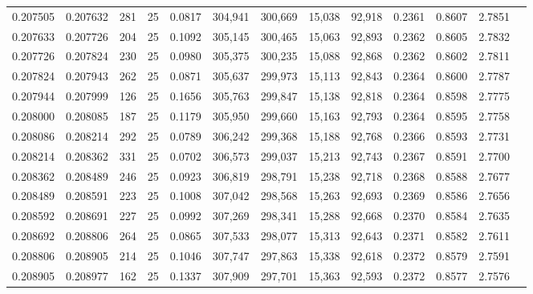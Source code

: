 \begin{tabular}{rrrrrrrrrrrrr}
0.207505 & 0.207632 &   281 &  25 &                                     0.0817 & 304,941 & 300,669 &  15,038 &  92,918 & 0.2361 & 0.8607 & 2.7851 \\
0.207633 & 0.207726 &   204 &  25 &                                     0.1092 & 305,145 & 300,465 &  15,063 &  92,893 & 0.2362 & 0.8605 & 2.7832 \\
0.207726 & 0.207824 &   230 &  25 &                                     0.0980 & 305,375 & 300,235 &  15,088 &  92,868 & 0.2362 & 0.8602 & 2.7811 \\
0.207824 & 0.207943 &   262 &  25 &                                     0.0871 & 305,637 & 299,973 &  15,113 &  92,843 & 0.2364 & 0.8600 & 2.7787 \\
0.207944 & 0.207999 &   126 &  25 &                                     0.1656 & 305,763 & 299,847 &  15,138 &  92,818 & 0.2364 & 0.8598 & 2.7775 \\
0.208000 & 0.208085 &   187 &  25 &                                     0.1179 & 305,950 & 299,660 &  15,163 &  92,793 & 0.2364 & 0.8595 & 2.7758 \\
0.208086 & 0.208214 &   292 &  25 &                                     0.0789 & 306,242 & 299,368 &  15,188 &  92,768 & 0.2366 & 0.8593 & 2.7731 \\
0.208214 & 0.208362 &   331 &  25 &                                     0.0702 & 306,573 & 299,037 &  15,213 &  92,743 & 0.2367 & 0.8591 & 2.7700 \\
0.208362 & 0.208489 &   246 &  25 &                                     0.0923 & 306,819 & 298,791 &  15,238 &  92,718 & 0.2368 & 0.8588 & 2.7677 \\
0.208489 & 0.208591 &   223 &  25 &                                     0.1008 & 307,042 & 298,568 &  15,263 &  92,693 & 0.2369 & 0.8586 & 2.7656 \\
0.208592 & 0.208691 &   227 &  25 &                                     0.0992 & 307,269 & 298,341 &  15,288 &  92,668 & 0.2370 & 0.8584 & 2.7635 \\
0.208692 & 0.208806 &   264 &  25 &                                     0.0865 & 307,533 & 298,077 &  15,313 &  92,643 & 0.2371 & 0.8582 & 2.7611 \\
0.208806 & 0.208905 &   214 &  25 &                                     0.1046 & 307,747 & 297,863 &  15,338 &  92,618 & 0.2372 & 0.8579 & 2.7591 \\
0.208905 & 0.208977 &   162 &  25 &                                     0.1337 & 307,909 & 297,701 &  15,363 &  92,593 & 0.2372 & 0.8577 & 2.7576 \\

\end{tabular}
